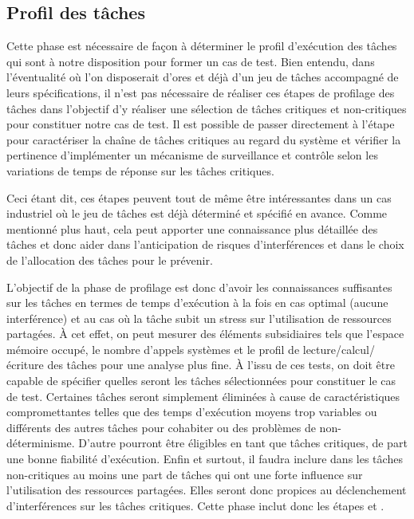 \documentclass[french, a4paper, 11pt, twoside, pdftex]{StyleThese}
\begin{document}
\subsection{Profil des tâches}
		Cette phase est nécessaire de façon à déterminer le profil d'exécution des tâches qui sont à notre disposition pour former un cas de test. Bien entendu, dans l'éventualité où l'on disposerait d'ores et déjà d'un jeu de tâches accompagné de leurs spécifications, il n'est pas nécessaire de réaliser ces étapes de profilage des tâches dans l'objectif d'y réaliser une sélection de tâches critiques et non-critiques pour constituer notre cas de test. Il est possible de passer directement à l'étape~ pour caractériser la chaîne de tâches critiques au regard du système et vérifier la pertinence d'implémenter un mécanisme de surveillance et contrôle selon les variations de temps de réponse sur les tâches critiques. 
		
		Ceci étant dit, ces étapes peuvent tout de même être intéressantes dans un cas industriel où le jeu de tâches est déjà déterminé et spécifié en avance. Comme mentionné plus haut, cela peut apporter une connaissance plus détaillée des tâches et donc aider dans l'anticipation de risques d'interférences et dans le choix de l'allocation des tâches pour le prévenir.
		
		L'objectif de la phase de profilage est donc d'avoir les connaissances suffisantes sur les tâches en termes de temps d'exécution à la fois en cas optimal (aucune interférence) et au cas où la tâche subit un stress sur l'utilisation de ressources partagées. À cet effet, on peut mesurer des éléments subsidiaires tels que l'espace mémoire occupé, le nombre d'appels systèmes et le profil de lecture/calcul/écriture des tâches pour une analyse plus fine. À l'issu de ces tests, on doit être capable de spécifier quelles seront les tâches sélectionnées pour constituer le cas de test. Certaines tâches seront simplement éliminées à cause de caractéristiques compromettantes telles que des temps d'exécution moyens trop variables ou différents des autres tâches pour cohabiter ou des problèmes de non-déterminisme. D'autre pourront être éligibles en tant que tâches critiques, de part une bonne fiabilité d'exécution. Enfin et surtout, il faudra inclure dans les tâches non-critiques au moins une part de tâches qui ont une forte influence sur l'utilisation des ressources partagées. Elles seront donc propices au déclenchement d'interférences sur les tâches critiques. Cette phase inclut donc les étapes  et .
		
\end{document}
